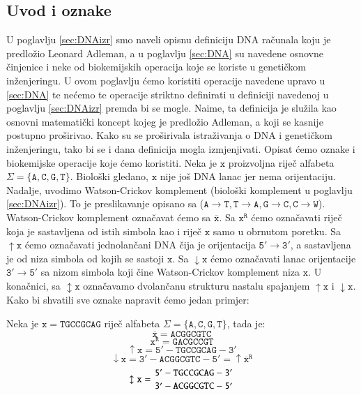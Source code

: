 \documentclass[a4paper,oneside,12pt]{memoir} %
\begin{document}
\begin{spacing}{1.5}
\subsection{Uvod i oznake}
U poglavlju \ref{sec:DNAizr} smo naveli opisnu definiciju DNA računala koju je predložio Leonard Adleman, a u poglavlju \ref{sec:DNA} su navedene osnovne činjenice i neke od biokemijskih operacija koje se koriste u genetičkom inženjeringu. U ovom poglavlju ćemo koristiti operacije navedene upravo u \ref{sec:DNA} te nećemo te operacije striktno definirati u definiciji navedenoj u poglavlju \ref{sec:DNAizr} premda bi se mogle. Naime, ta definicija je služila kao osnovni matematički koncept kojeg je predložio Adleman, a koji se kasnije postupno proširivao. Kako su se proširivala istraživanja o DNA i genetičkom inženjeringu, tako bi se i dana definicija mogla izmjenjivati. Opisat ćemo oznake i biokemijske operacije koje ćemo koristiti.
Neka je $\mathtt{x}$ proizvoljna riječ alfabeta $\Sigma =\{\mathtt{A,C,G,T}\}$. Biološki gledano, $\mathtt{x}$ nije još DNA lanac jer nema orijentaciju. Nadalje, uvodimo Watson-Crickov komplement (biološki komplement u poglavlju \ref{sec:DNAizr}). To je preslikavanje opisano sa ($\mathtt{A \to T, T \to A, G \to C, C \to W}$). Watson-Crickov komplement označavat ćemo sa $\mathtt{\overline{x}}$. Sa $\mathtt{x^R}$ ćemo označavati riječ koja je sastavljena od istih simbola kao i riječ $\mathtt{x}$ samo u obrnutom poretku. Sa $\mathtt{\uparrow x}$ ćemo označavati  jednolančani DNA čija je orijentacija $\mathtt{5' \to 3'}$, a sastavljena  je od niza simbola od kojih se sastoji $\mathtt{x}$. Sa $\mathtt{\downarrow x}$ ćemo označavati lanac orijentacije $\mathtt{3'\to 5'}$ sa nizom simbola koji čine Watson-Crickov komplement niza $\mathtt{x}$. U konačnici, sa $\mathtt{\updownarrow x}$ označavamo dvolančanu strukturu nastalu spajanjem $\mathtt{\uparrow x}$ i $\mathtt{\downarrow x}$. Kako bi shvatili sve oznake napravit ćemo jedan primjer:
\begin{exa}
Neka je $\mathtt{x=TGCCGCAG}$ riječ alfabeta $\mathtt{\Sigma=\{A,C,G,T\}}$, tada je:
\[\mathtt{\overline{x}= ACGGCGTC}\]
\[\mathtt{x^R=GACGCCGT}\]
\[\mathtt{\uparrow x=5'-TGCCGCAG-3'}\]
\[\mathtt{\downarrow x=3'-ACGGCGTC-5'=	\uparrow \overline{x}^R}\]
\[\mathtt{\updownarrow x={5'-TGCCGCAG-3' \atop 3'-ACGGCGTC-5'}}\]
\end{exa}

\end{spacing}
\end{document}

